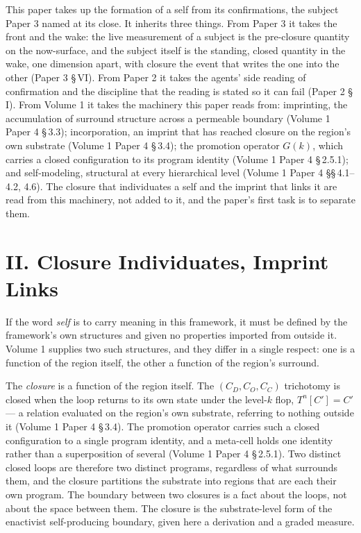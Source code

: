 \documentclass[11pt,oneside]{report}
\theoremstyle{definition}
\theoremstyle{remark}
\begin{document}
This paper takes up the formation of a self from its confirmations, the subject
Paper 3 named at its close. It inherits three things. From Paper 3 it takes the
front and the wake: the live measurement of a subject is the pre-closure
quantity on the now-surface, and the subject itself is the standing, closed
quantity in the wake, one dimension apart, with closure the event that writes
the one into the other (Paper 3 \S\,VI). From Paper 2 it takes the agents' side
reading of confirmation and the discipline that the reading is stated so it can
fail (Paper 2 \S\,I). From Volume 1 it takes the machinery this paper reads
from: imprinting, the accumulation of surround structure across a permeable
boundary (Volume 1 Paper 4 \S\,3.3); incorporation, an imprint that has reached
closure on the region's own substrate (Volume 1 Paper 4 \S\,3.4); the promotion
operator \ensuremath{G(k)}, which carries a closed configuration to its program
identity (Volume 1 Paper 4 \S\,2.5.1); and self-modeling, structural at every
hierarchical level (Volume 1 Paper 4 \S\S\,4.1--4.2, 4.6). The closure that
individuates a self and the imprint that links it are read from this machinery,
not added to it, and the paper's first task is to separate them.

\section*{II. Closure Individuates, Imprint Links}

If the word \emph{self} is to carry meaning in this framework, it must be
defined by the framework's own structures and given no properties imported from
outside it. Volume 1 supplies two such structures, and they differ in a single
respect: one is a function of the region itself, the other a function of the
region's surround.

The \emph{closure} is a function of the region itself. The
\ensuremath{(C_D, C_O, C_C)} trichotomy is closed when the loop returns to its
own state under the level-\ensuremath{k} flop, \ensuremath{T^{n}[C'] = C'} --- a
relation evaluated on the region's own substrate, referring to nothing outside
it (Volume 1 Paper 4 \S\,3.4). The promotion operator carries such a closed
configuration to a single program identity, and a meta-cell holds one identity
rather than a superposition of several (Volume 1 Paper 4 \S\,2.5.1). Two
distinct closed loops are therefore two distinct programs, regardless of what
surrounds them, and the closure partitions the substrate into regions that are
each their own program. The boundary between two closures is a fact about the
loops, not about the space between them. The closure is the substrate-level
form of the enactivist self-producing boundary, given here a derivation and a
graded measure.
\end{document}
